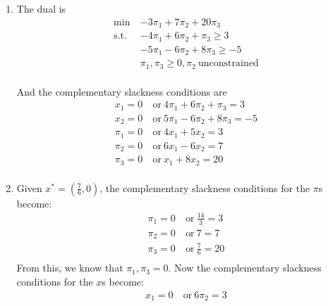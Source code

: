 \documentclass[12pt]{article}
\begin{document}
\begin{enumerate}
\begin{enumerate}
\begin{enumerate}
          \item
            The dual is
            \begin{equation}
              \begin{split}
                \text{min}\ &-3\pi_1+7\pi_2+20\pi_3\\
                \text{s.t.}\ &-4\pi_1+6\pi_2+\pi_3\geq3\\
                &-5\pi_1-6\pi_2+8\pi_3\geq-5\\
                &\pi_1,\pi_3\geq0,\pi_2\ \text{unconstrained}\\
              \end{split}
            \end{equation}

            And the complementary slackness conditions are
            \begin{equation}
              \begin{split}
                x_1=0&\ \text{or}\ 4\pi_1+6\pi_2+\pi_3=3\\
                x_2=0&\ \text{or}\ 5\pi_1-6\pi_2+8\pi_3=-5\\
                \pi_1=0&\ \text{or}\ 4x_1+5x_2=3\\
                \pi_2=0&\ \text{or}\ 6x_1-6x_2=7\\
                \pi_3=0&\ \text{or}\ x_1+8x_2=20\\
              \end{split}
            \end{equation}
          \item
            Given $x^* = (\frac{7}{6},0)$, the complementary slackness conditions
            for the $\pi$s become:
            \begin{equation}
              \begin{split}
                \pi_1=0&\ \text{or}\ \frac{14}{3}=3\\
                \pi_2=0&\ \text{or}\ 7=7\\
                \pi_3=0&\ \text{or}\ \frac{7}{6}=20\\
              \end{split}
            \end{equation}
            From this, we know that $\pi_1,\pi_3=0$. Now the complementary slackness
            conditions for the $x$s become:
            \begin{equation}
              \begin{split}
                x_1=0&\ \text{or}\ 6\pi_2=3\\

\end{split}
\end{equation}
\end{enumerate}
\end{enumerate}
\end{enumerate}
\end{document}
